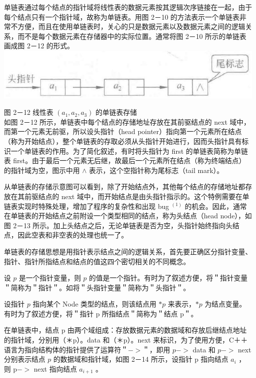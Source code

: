 \documentclass[10pt]{article}
\begin{document}
单链表通过每个结点的指针域将线性表的数据元素按其逻辑次序链接在一起，由于每个结点只有一个指针域，故称为单链表。用图 2－10 的方法表示一个单链表非常不方便，而且在使用单链表时，关心的只是数据元素以及数据元素之间的逻辑关系，而不是每个数据元素在存储器中的实际位置。通常将图 2－10 所示的单链表画成图 2－12 的形式。\\
\includegraphics[max width=\textwidth, center]{2025_06_06_704745ea57b15b2333e5g-052}

图 2－12 线性表 $\left(a_{1}, a_{2}, a_{3}\right)$ 的单链表存储\\
如图 2－12 所示，单链表中每个结点的存储地址存放在其前驱结点的 next 域中，而第一个元素无前驱，所以设头指针（head pointer）指向第一个元素所在结点（称为开始结点），整个单链表的存取必须从头指针开始进行，因而头指针具有标识一个单链表的作用。为了简化叙述，有时将头指针为 first 的单链表简称为单链表 first。由于最后一个元素无后继，故最后一个元素所在结点（称为终端结点）的指针域为空，图示中用 $\wedge$ 表示，这个空指针称为尾标志（tail mark）。

从单链表的存储示意图可以看到，除了开始结点外，其他每个结点的存储地址都存放在其前驱结点的 next 域中，而开始结点是由头指针指示的。这个特例需要在单链表实现时特殊处理，增加了程序的复杂性和出现 bug ${ }^{(1)}$ 的机会。因此，通常在单链表的开始结点之前附设一个类型相同的结点，称为头结点（head node），如图 2－13 所示。加上头结点之后，无论单链表是否为空，头指针始终指向头结点，因此空表和非空表的处理也统一了。

单链表的存储思想是用指针表示结点之间的逻辑关系，首先要正确区分指针变量、指针、指针所指结点和结点的值这四个密切相关的不同概念。

设 $p$ 是一个指针变量，则 $p$ 的值是一个指针。有时为了叙述方便，将＂指针变量＂简称为＂指针＂。如将＂头指针变量＂简称为＂头指针＂。

设指针 $p$ 指向某个 Node 类型的结点，则该结点用 $* p$ 来表示，$* p$ 为结点变量。有时为了叙述方便，将＂指针 p 所指结点＂简称为＂结点 p＂。

在单链表中，结点 p 由两个域组成：存放数据元素的数据域和存放后继结点地址的指针域，分别用（＊p）。data 和（＊p）。next 来标识，为了使用方便，C＋＋语言为指向结构体的指针提供了运算符＂$->$＂，即用 $p->$ data 和 $p->$ next 分别表示结点 $p$ 的数据域和指针域，如图 2－14 所示，设指针 p 指向结点 $a_{i}$ ，则 $\mathrm{p}->$ next 指向结点 $a_{i+1}$ 。
\end{document}
